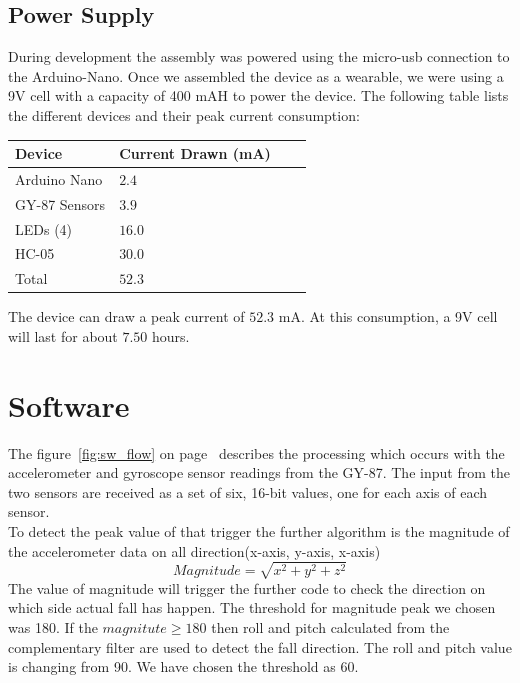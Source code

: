 \documentclass[11pt, a4paper]{article}
\begin{document}
\subsection{Power Supply}
During development the assembly was powered using the micro-usb connection to
the Arduino-Nano. Once we assembled the device as a wearable, we were using a
9V cell with a capacity of 400 mAH to power the device. The following table
lists the different devices and their peak current consumption:

\begin{center}
   \begin{tabular}{llll}
      \hline
      Device & Current Drawn (mA) \\
      \hline
      Arduino Nano & $2.4$ \\
      GY-87 Sensors & $3.9$ \\
      LEDs (4) & $16.0$ & \\
      HC-05 & $30.0$ \\
      \hline
      Total & $52.3$ \\
      \hline
   \end{tabular}
\end{center}

\noindent The device can draw a peak current of $52.3$ mA. At this
consumption, a 9V cell will last for about $7.50$ hours.

\section{Software}
The figure~\ref{fig:sw_flow} on page~\pageref{fig:sw_flow} describes the
processing which occurs with the accelerometer and gyroscope sensor readings
from the GY-87. The input from the two sensors are received as a set of six,
16-bit values, one for each axis of each sensor. \\

To detect the peak value of that trigger the further algorithm is the magnitude of the accelerometer data on all direction(x-axis, y-axis, x-axis)
\begin{equation}
	\label{eq:mag}
	Magnitude = \sqrt{x^{2} + y^{2} + z^{2}}
\end{equation}
The value of magnitude will trigger the further code to check the direction on which side actual fall has happen. The threshold for magnitude peak we chosen was 180. If the $magnitute \geq 180$ then roll and pitch calculated from the complementary filter are used to detect the fall direction. The roll and pitch value is changing from 90. We have chosen the threshold as 60.
\end{document}
